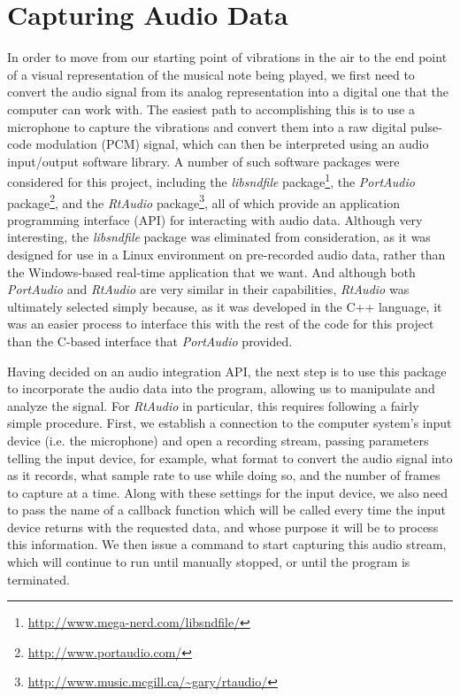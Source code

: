 \documentclass[12pt]{report}
\begin{document}
\section{Capturing Audio Data}	
\indent In order to move from our starting point of vibrations in the air to the end point of a visual representation of the musical note being played, we first need to convert the audio signal from its analog representation into a digital one that the computer can work with. The easiest path to accomplishing this is to use a microphone to capture the vibrations and convert them into a raw digital pulse-code modulation (PCM) signal, which can then be interpreted using an audio input/output software library. A number of such software packages were considered for this project, including the \emph{libsndfile} package\footnote{\url{http://www.mega-nerd.com/libsndfile/}}, the \emph{PortAudio} package\footnote{\url{http://www.portaudio.com/}}, and the \emph{RtAudio} package\footnote{\url{http://www.music.mcgill.ca/~gary/rtaudio/}}, all of which provide an application programming interface (API) for interacting with audio data. Although very interesting, the \emph{libsndfile} package was eliminated from consideration, as it was designed for use in a Linux environment on pre-recorded audio data, rather than the Windows-based real-time application that we want. And although both \emph{PortAudio} and \emph{RtAudio} are very similar in their capabilities, \emph{RtAudio} was ultimately selected simply because, as it was developed in the C++ language, it was an easier process to interface this with the rest of the code for this project than the C-based interface that \emph{PortAudio} provided.

\indent Having decided on an audio integration API, the next step is to use this package to incorporate the audio data into the program, allowing us to manipulate and analyze the signal. For \emph{RtAudio} in particular, this requires following a fairly simple procedure. First, we establish a connection to the computer system's input device (i.e. the microphone) and open a recording stream, passing parameters telling the input device, for example, what format to convert the audio signal into as it records, what sample rate to use while doing so, and the number of frames to capture at a time. Along with these settings for the input device, we also need to pass the name of a callback function which will be called every time the input device returns with the requested data, and whose purpose it will be to process this information. We then issue a command to start capturing this audio stream, which will continue to run until manually stopped, or until the program is terminated.
\end{document}
